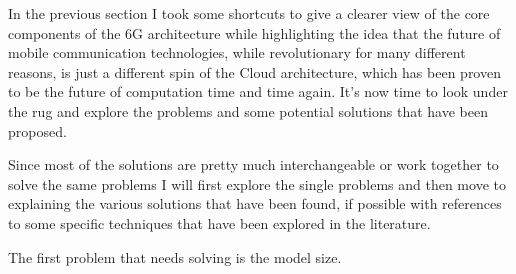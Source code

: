 

In the previous section I took some shortcuts to give a clearer view of the core components of the
6G architecture while highlighting the idea that the future of mobile communication technologies,
while revolutionary for many different reasons, is just a different spin of the Cloud architecture,
which has been proven to be the future of computation time and time again. It's now time to look
under the rug and explore the problems and some potential solutions that have been proposed.

Since most of the solutions are pretty much interchangeable or work together to solve the same
problems I will first explore the single problems and then move to explaining the various solutions
that have been found, if possible with references to some specific techniques that have been
explored in the literature.

The first problem that needs solving is the model size.


